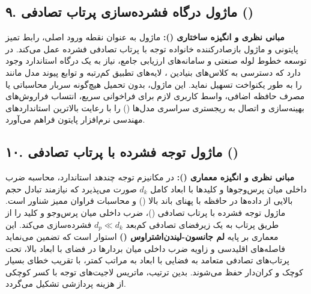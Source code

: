 \subsection*{۹. ماژول درگاه فشرده‌سازی پرتاب تصادفی  ()}

\textbf{مبانی نظری و انگیزه ساختاری ():}
ماژول  به عنوان نقطه ورود اصلی، رابط تمیز پایتونی و ماژول بازصادرکننده خانواده توجه با پرتاب تصادفی فشرده عمل می‌کند. در توسعه خطوط لوله صنعتی و سامانه‌های ارزیابی جامع، نیاز به یک درگاه استاندارد وجود دارد که دسترسی به کلاس‌های بنیادین ، لایه‌های تطبیق کم‌رتبه  و توابع پیوند مدل مانند  را به طور یکنواخت تسهیل نماید.
این ماژول، بدون تحمیل هیچ‌گونه سربار محاسباتی یا مصرف حافظه اضافی، واسط کاربری لازم برای فراخوانی سریع، انتساب فراروش‌های بهینه‌سازی و اتصال به ریجستری سراسری مدل‌ها () را با رعایت بالاترین استانداردهای مهندسی نرم‌افزار پایتون فراهم می‌آورد.



\subsection*{۱۰. ماژول توجه فشرده با پرتاب تصادفی  ()}

\textbf{مبانی نظری و انگیزه معماری ():}
در مکانیزم توجه چندهد استاندارد، محاسبه ضرب داخلی میان پرس‌وجوها و کلیدها با ابعاد کامل $d_k$ صورت می‌پذیرد که نیازمند تبادل حجم بالایی از داده‌ها در حافظه با پهنای باند بالا () و محاسبات فراوان ممیز شناور است. ماژول توجه فشرده با پرتاب تصادفی ()، ضرب داخلی میان پرس‌وجو و کلید را از طریق پرتاب به یک زیرفضای تصادفی کم‌بعد $d_p \ll d_k$ فشرده‌سازی می‌کند.
این معماری بر پایه \textbf{لم جانسون-لیندن‌اشتراوس ()} استوار است که تضمین می‌نماید فاصله‌های اقلیدسی و زاویه ضرب داخلی میان بردارها در فضای با ابعاد بالا، تحت پرتاب‌های تصادفی متعامد به فضایی با ابعاد به مراتب کمتر، با تقریب خطای بسیار کوچک و کران‌دار حفظ می‌شوند. بدین ترتیب، ماتریس لاجیت‌های توجه با کسر کوچکی از هزینه پردازشی تشکیل می‌گردد.

